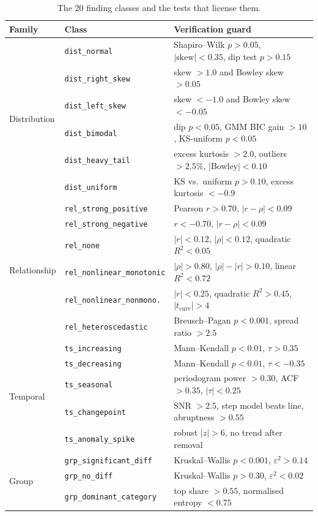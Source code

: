 \documentclass[11pt,a4paper]{article}
\begin{document}
\begin{table}[t]\centering\small
\caption{The 20 finding classes and the tests that license them.}
\label{tab:classes}
\begin{tabular}{llp{7.6cm}}
\toprule
\textbf{Family} & \textbf{Class} & \textbf{Verification guard} \\
\midrule
\multirow{6}{*}{Distribution}
 & \texttt{dist\_normal}        & Shapiro--Wilk $p>0.05$, $|\text{skew}|<0.35$, dip test\cite{hartigan} $p>0.15$ \\
 & \texttt{dist\_right\_skew}   & skew $>1.0$ and Bowley skew $>0.05$ \\
 & \texttt{dist\_left\_skew}    & skew $<-1.0$ and Bowley skew $<-0.05$ \\
 & \texttt{dist\_bimodal}       & dip $p<0.05$, GMM BIC gain $>10$, KS-uniform $p<0.05$ \\
 & \texttt{dist\_heavy\_tail}   & excess kurtosis $>2.0$, outliers $>2.5\%$, $|$Bowley$|<0.10$ \\
 & \texttt{dist\_uniform}       & KS vs.\ uniform $p>0.10$, excess kurtosis $<-0.9$ \\
\midrule
\multirow{6}{*}{Relationship}
 & \texttt{rel\_strong\_positive}      & Pearson $r>0.70$, $|r-\rho|<0.09$ \\
 & \texttt{rel\_strong\_negative}      & $r<-0.70$, $|r-\rho|<0.09$ \\
 & \texttt{rel\_none}                  & $|r|<0.12$, $|\rho|<0.12$, quadratic $R^2<0.05$ \\
 & \texttt{rel\_nonlinear\_monotonic}  & $|\rho|>0.80$, $|\rho|-|r|>0.10$, linear $R^2<0.72$ \\
 & \texttt{rel\_nonlinear\_nonmono.}   & $|r|<0.25$, quadratic $R^2>0.45$, $|t_{\text{curv}}|>4$ \\
 & \texttt{rel\_heteroscedastic}       & Breusch--Pagan\cite{breuschpagan} $p<0.001$, spread ratio $>2.5$ \\
\midrule
\multirow{5}{*}{Temporal}
 & \texttt{ts\_increasing}    & Mann--Kendall\cite{kendall} $p<0.01$, $\tau>0.35$ \\
 & \texttt{ts\_decreasing}    & Mann--Kendall $p<0.01$, $\tau<-0.35$ \\
 & \texttt{ts\_seasonal}      & periodogram power $>0.30$, ACF $>0.35$, $|\tau|<0.25$ \\
 & \texttt{ts\_changepoint}   & SNR $>2.5$, step model beats line, abruptness $>0.55$ \\
 & \texttt{ts\_anomaly\_spike}& robust $|z|>6$, no trend after removal \\
\midrule
\multirow{3}{*}{Group}
 & \texttt{grp\_significant\_diff} & Kruskal--Wallis\cite{kruskal} $p<0.001$, $\varepsilon^2>0.14$ \\
 & \texttt{grp\_no\_diff}          & Kruskal--Wallis $p>0.30$, $\varepsilon^2<0.02$ \\
 & \texttt{grp\_dominant\_category}& top share $>0.55$, normalised entropy $<0.75$ \\
\bottomrule
\end{tabular}
\end{table}
\end{document}
